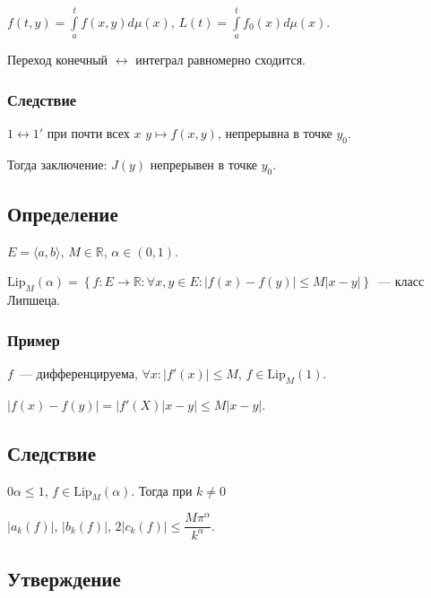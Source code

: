 \documentclass{article}
\begin{document}
            $f(t, y) = \int\limits^t_a f(x, y) d \mu (x)$, $L(t) = \int\limits^t_a f_0(x) d \mu (x)$.
            
            Переход конечный $\leftrightarrow$ интеграл равномерно сходится.
            
        \subsubsection{Следствие}
        
            $1 \leftrightarrow 1'$ при почти всех $x$ $y \mapsto f(x, y)$, непрерывна в точке $y_0$.
            
            Тогда заключение: $J(y)$ непрерывен в точке $y_0$.
            
    \subsection{Определение}
    
        $E = \langle a, b \rangle$, $M \in \mathbb{R}$, $\alpha \in (0, 1)$.
        
        $\mathrm{Lip}_M(\alpha) = \left\{ f : E \rightarrow \mathbb{R} : \forall x, y \in E : \left| f(x) - f(y) \right| \leqslant M | x - y | \right\}$~--- класс Липшеца.
    
        \subsubsection{Пример}
        
            $f$~--- дифференцируема, $\forall x : \left| f'(x) \right| \leqslant M$, $f \in \mathrm{Lip}_M(1)$.
            
            $\left| f(x) - f(y) \right| = | f'(X) | x - y | \leqslant M | x - y |$.
           
    \subsection{Следствие}
    
        $0 \alpha \leqslant 1$, $f \in \mathrm{Lip}_M (\alpha)$. Тогда при $k \neq 0$
        
        $\left| a_k(f) \right|$, $\left| b_k(f) \right|$, $2 \left| c_k(f) \right| \leqslant \dfrac{M \pi^{\alpha}}{k^{\alpha}}$.
        
    \subsection{Утверждение}
    
\end{document}
